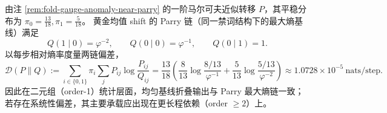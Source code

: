 \begin{remark}\label{rem:fold-gauge-anomaly-parry-kl}
由注 \ref{rem:fold-gauge-anomaly-near-parry} 的一阶马尔可夫近似转移 \(P\)，其平稳分布为 \(\pi_0=\frac{13}{18},\pi_1=\frac{5}{18}\)。
黄金均值 shift 的 Parry 链（同一禁词结构下的最大熵基线）满足
\[
Q(1\mid 0)=\varphi^{-2},\qquad Q(0\mid 0)=\varphi^{-1},\qquad Q(0\mid 1)=1.
\]
以每步相对熵率度量两链偏差，
\[
\mathcal D(P\|Q):=\sum_{i\in\{0,1\}}\pi_i\sum_j P_{ij}\log\frac{P_{ij}}{Q_{ij}}
=\frac{13}{18}\!\left(\frac{8}{13}\log\frac{8/13}{\varphi^{-1}}+\frac{5}{13}\log\frac{5/13}{\varphi^{-2}}\right)
\approx 1.0728\times 10^{-5}\ \text{nats/step}.
\]
因此在二元组（order-1）统计层面，均匀基线折叠输出与 Parry 最大熵链一致；若存在系统性偏差，其主要承载应出现在更长程依赖（order \(\ge 2\)）上。
\end{remark}
\fi

